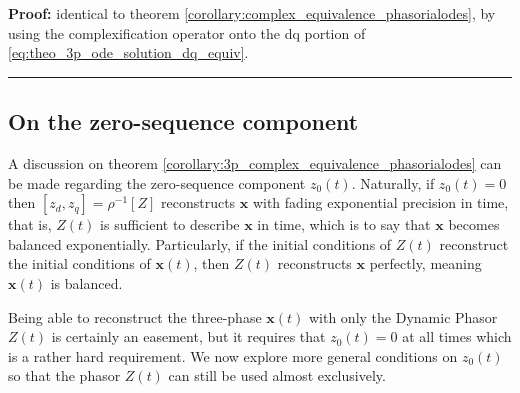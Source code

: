 \textbf{Proof:} identical to theorem \ref{corollary:complex_equivalence_phasorialodes}, by using the complexification operator onto the dq portion of \eqref{eq:theo_3p_ode_solution_dq_equiv}.
\vspace{3mm}
\hrule
\vspace{3mm}

\subsection{On the zero-sequence component}\label{subsec:zeroseq_comp} %

	A discussion on theorem \ref{corollary:3p_complex_equivalence_phasorialodes} can be made regarding the zero-sequence component $z_0(t)$. Naturally, if $z_0(t) = 0$ then $\left[z_d,z_q\right] = \rho^{-1}\left[Z\right]$ reconstructs $\mathbf{x}$ with fading exponential precision in time, that is, $Z(t)$ is sufficient to describe $\mathbf{x}$ in time, which is to say that $\mathbf{x}$ becomes balanced exponentially. Particularly, if the initial conditions of $Z(t)$ reconstruct the initial conditions of $\mathbf{x}(t)$, then $Z(t)$ reconstructs $\mathbf{x}$ perfectly, meaning $\mathbf{x}(t)$ is balanced.

	Being able to reconstruct the three-phase $\mathbf{x}(t)$ with only the Dynamic Phasor $Z(t)$ is certainly an easement, but it requires that $z_0(t) = 0$ at all times which is a rather hard requirement. We now explore more general conditions on $z_0(t)$ so that the phasor $Z(t)$ can still be used almost exclusively.

